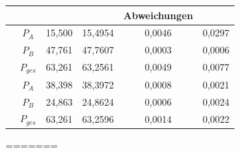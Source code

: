 \documentclass[
12pt,
a4paper,
headings=small,                    %
bibliography=totoc,                %
listof=totoc,                      %
parskip=half*,                     %
]{scrartcl}                        %
\begin{document}
\resetlaborsectioncounter
{}
\begin{table}[H]
    \centering
    \renewcommand{\arraystretch}{2} %
    \setlength{\tabcolsep}{0.3em} %
 
	\begin{tabular}{|c|c|S[ table-format = 2.3]|S[ table-format = 2.3]|S[ table-format = 1.4]|S[ table-format = 1.4]|}
	\hline
	& {} & {} &{Abweichungen} &{} \\ \hline
	&  $P_A$ & 15,500 & 15,4954 & 0,0046 & 0,0297 \\  
	& $P_B$ & 47,761 & 47,7607 & 0,0003 & 0,0006 \\  
	& $P_{ges}$ & 63,261 & 63,2561 & 0,0049 & 0,0077 \\ \hline
	& $P_A$ & 38,398 & 38,3972 & 0,0008 & 0,0021 \\  
	& $P_B$ & 24,863 & 24,8624 & 0,0006 & 0,0024 \\  
	& $P_{ges}$ & 63,261 & 63,2596 & 0,0014 & 0,0022 \\ \hline
\end{tabular}
=======
 \tableofcontents
 \newpage
 

\end{table}
\end{document}
